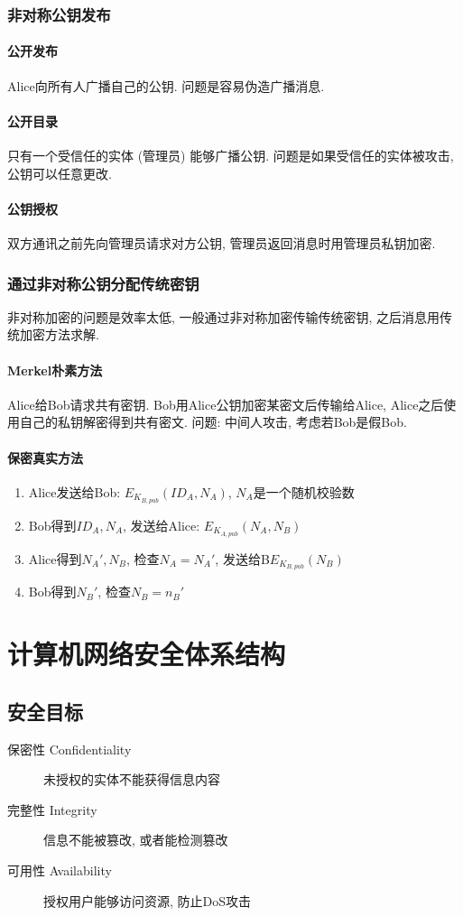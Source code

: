 \documentclass{ctexart}
\begin{document}
\subsubsection{非对称公钥发布}
\paragraph{公开发布} Alice向所有人广播自己的公钥. 问题是容易伪造广播消息.
\paragraph{公开目录} 只有一个受信任的实体 (管理员) 能够广播公钥. 问题是如果受信任的实体被攻击, 公钥可以任意更改.
\paragraph{公钥授权} 双方通讯之前先向管理员请求对方公钥, 管理员返回消息时用管理员私钥加密.
\subsubsection{通过非对称公钥分配传统密钥}
    非对称加密的问题是效率太低, 一般通过非对称加密传输传统密钥, 之后消息用传统加密方法求解.
\paragraph{Merkel朴素方法} Alice给Bob请求共有密钥. Bob用Alice公钥加密某密文后传输给Alice, Alice之后使用自己的私钥解密得到共有密文.
    问题: 中间人攻击, 考虑若Bob是假Bob.
\paragraph{保密真实方法} \begin{enumerate}
        \item Alice发送给Bob: $E_{K_{B, pub}}(ID_A, N_A)$, $N_A$是一个随机校验数
        \item Bob得到$ID_A, N_A$, 发送给Alice: $E_{K_{A, pub}}(N_A, N_B)$
        \item Alice得到$N_A', N_B$, 检查$N_A = N_A'$, 发送给B$E_{K_{B, pub}}(N_B)$
        \item Bob得到$N_B'$, 检查$N_B = n_B'$
    \end{enumerate}


\section{计算机网络安全体系结构}
\subsection{安全目标}
    \begin{description}
        \item[保密性 Confidentiality] 未授权的实体不能获得信息内容
        \item[完整性 Integrity] 信息不能被篡改, 或者能检测篡改
        \item[可用性 Availability] 授权用户能够访问资源, 防止DoS攻击
    \end{description}
\end{document}
